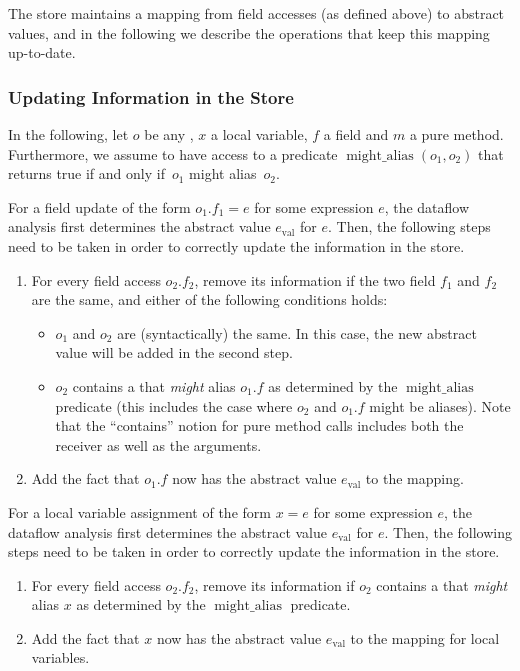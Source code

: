 The store maintains a mapping from field accesses (as defined above) to
abstract values, and in the following we describe the operations that
keep this mapping up-to-date.

\subsubsection{Updating Information in the Store}

\newcommand{\alias}{\operatorname{might\_alias}}

In the following, let $o$ be any ,
$x$ a local variable, $f$ a
field and $m$ a pure method.  Furthermore, we assume to have access to
a predicate $\alias(o_1,o_2)$ that returns true if and only
if~$o_1$ might alias~$o_2$.


For a field update of the form $o_1.f_1 = e$ for some expression $e$, the
dataflow analysis first determines the abstract value $e_\text{val}$ for $e$.
Then, the following steps need to be taken in order to correctly update
the information in the store.
\begin{enumerate}
    \item For every field access $o_2.f_2$, remove its information if
    the two field $f_1$ and $f_2$ are the same, and either of the following
    conditions holds:
    \begin{itemize}
        \item $o_1$ and $o_2$ are (syntactically) the same.  In this case, the
        new abstract value will be added in the second step.
        \item $o_2$ contains a  that \emph{might}
        alias $o_1.f$ as determined by the $\alias$
        predicate (this includes the case where $o_2$ and $o_1.f$ might be
        aliases).  Note that the ``contains'' notion for pure method calls
        includes both the receiver as well as the arguments.
    \end{itemize}
    \item Add the fact that $o_1.f$ now has the abstract value $e_\text{val}$
    to the mapping.
\end{enumerate}



For a local variable assignment of the form $x = e$ for some expression $e$,
the dataflow analysis first determines the abstract value $e_\text{val}$ for
$e$. Then, the following steps need to be taken in order to correctly update
the information in the store.
\begin{enumerate}
    \item For every field access $o_2.f_2$, remove its information if
    $o_2$ contains a  that \emph{might}
    alias $x$ as determined by the $\alias$
    predicate.
    \item Add the fact that $x$ now has the abstract value $e_\text{val}$
    to the mapping for local variables.
\end{enumerate}

